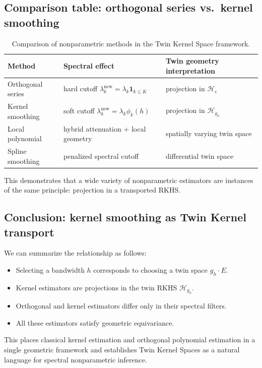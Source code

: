 \documentclass[11pt,a4paper]{article}
\newcommand{\RKHS}{\mathcal{H}}
\begin{document}
\subsection{Comparison table: orthogonal series vs.\ kernel smoothing}

\begin{table}[h]
\centering
\begin{tabular}{@{}lll@{}}
\toprule
\textbf{Method} & \textbf{Spectral effect} & \textbf{Twin geometry interpretation} \\
\midrule
Orthogonal series & hard cutoff $\lambda_k^{\mathrm{new}} = \lambda_k \mathbf{1}_{k \leq K}$ & projection in $\RKHS_e$ \\
Kernel smoothing & soft cutoff $\lambda_k^{\mathrm{new}} = \lambda_k \phi_k(h)$ & projection in $\RKHS_{g_h}$ \\
Local polynomial & hybrid attenuation + local geometry & spatially varying twin space \\
Spline smoothing & penalized spectral cutoff & differential twin space \\
\bottomrule
\end{tabular}
\caption{Comparison of nonparametric methods in the Twin Kernel Space framework.}
\label{tab:comparison}
\end{table}

This demonstrates that a wide variety of nonparametric estimators are instances of the same principle: projection in a transported RKHS.

\subsection{Conclusion: kernel smoothing as Twin Kernel transport}

We can summarize the relationship as follows:
\begin{itemize}
\item Selecting a bandwidth $h$ corresponds to choosing a twin space $g_h \cdot E$.
\item Kernel estimators are projections in the twin RKHS $\RKHS_{g_h}$.
\item Orthogonal and kernel estimators differ only in their spectral filters.
\item All these estimators satisfy geometric equivariance.
\end{itemize}

This places classical kernel estimation and orthogonal polynomial estimation in a single geometric framework and establishes Twin Kernel Spaces as a natural language for spectral nonparametric inference.
\end{document}

